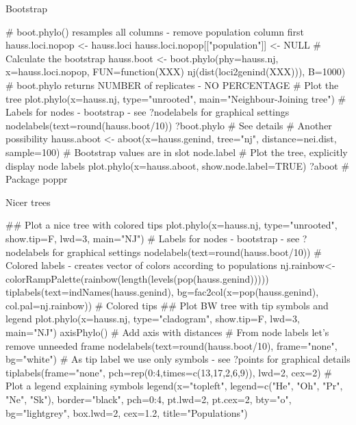 \documentclass[compress, ucs, xelatex, 11pt, xcolor=svgnames,
  hyperref={
    bookmarks=true,
    unicode=true,
    colorlinks=true,
    pdftitle={Molecular data in R},
    plainpages=false,
    pdfauthor={Vojtech Zeisek},
    pdfsubject={Course about phylogeny and evolution in R},
    pdfcreator={XeLaTeX},
    pdfkeywords={R, evolution, phylogeny, molecular data},
    linkcolor=Tomato,
    anchorcolor=SaddleBrown,
    citecolor=Goldenrod,
    filecolor=DarkMagenta,
    menucolor=Sienna,
    urlcolor=DarkTurquoise,
    pdftex},
  url={hyphens, lowtilde} %
  ]{beamer}
\begin{document}
\begin{frame}[fragile]{Bootstrap}
  \begin{spluscode}
    # boot.phylo() resamples all columns - remove population column first
    hauss.loci.nopop <- hauss.loci
    hauss.loci.nopop[["population"]] <- NULL
    # Calculate the bootstrap
    hauss.boot <- boot.phylo(phy=hauss.nj, x=hauss.loci.nopop,
      FUN=function(XXX) nj(dist(loci2genind(XXX))), B=1000)
    # boot.phylo returns NUMBER of replicates - NO PERCENTAGE
    # Plot the tree
    plot.phylo(x=hauss.nj, type="unrooted", main="Neighbour-Joining tree")
    # Labels for nodes - bootstrap - see ?nodelabels for graphical settings
    nodelabels(text=round(hauss.boot/10))
    ?boot.phylo # See details
    # Another possibility
    hauss.aboot <- aboot(x=hauss.genind, tree="nj", distance=nei.dist,
      sample=100) # Bootstrap values are in slot node.label
    # Plot the tree, explicitly display node labels
    plot.phylo(x=hauss.aboot, show.node.label=TRUE)
    ?aboot # Package poppr
  \end{spluscode}
\end{frame}

\begin{frame}[fragile]{Nicer trees}
  \begin{footnotesize}
  \begin{spluscode}
    ## Plot a nice tree with colored tips
    plot.phylo(x=hauss.nj, type="unrooted", show.tip=F, lwd=3, main="NJ")
    # Labels for nodes - bootstrap - see ?nodelabels for graphical settings
    nodelabels(text=round(hauss.boot/10))
    # Colored labels - creates vector of colors according to populations
    nj.rainbow<-colorRampPalette(rainbow(length(levels(pop(hauss.genind)))))
    tiplabels(text=indNames(hauss.genind), bg=fac2col(x=pop(hauss.genind), 
      col.pal=nj.rainbow)) # Colored tips
    ## Plot BW tree with tip symbols and legend
    plot.phylo(x=hauss.nj, type="cladogram", show.tip=F, lwd=3, main="NJ")
    axisPhylo() # Add axis with distances
    # From node labels let's remove unneeded frame
    nodelabels(text=round(hauss.boot/10), frame="none", bg="white")
    # As tip label we use only symbols - see ?points for graphical details
    tiplabels(frame="none", pch=rep(0:4,times=c(13,17,2,6,9)), lwd=2, cex=2)
    # Plot a legend explaining symbols
    legend(x="topleft", legend=c("He", "Oh", "Pr", "Ne", "Sk"), 
      border="black", pch=0:4, pt.lwd=2, pt.cex=2, bty="o", bg="lightgrey",
      box.lwd=2, cex=1.2, title="Populations")
  \end{spluscode}
  \end{footnotesize}
\end{frame}
\end{document}
